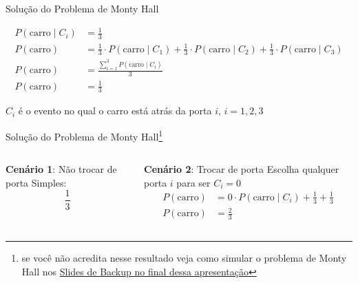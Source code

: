\begin{frame}{Solução do Problema de Monty Hall}
	\begin{idea}
		$$
			\begin{aligned}
				P(\text{carro} \mid C_i) & = \frac{1}{3}                                                                                                                          \\
				P(\text{carro})          & = \frac{1}{3} \cdot P(\text{carro} \mid C_1) + \frac{1}{3} \cdot P(\text{carro} \mid C_2) + \frac{1}{3} \cdot P(\text{carro} \mid C_3) \\
				P(\text{carro})          & = \frac{\sum^3_{i=1}P(\text{carro} \mid C_i)}{3}                                                                                       \\
				P(\text{carro})          & = \frac{1}{3}
			\end{aligned}
		$$
	\end{idea}
	\vfill \vfill
	$C_i$ é o evento no qual o carro está atrás da porta $i$, $i=1,2,3$
\end{frame}

\begin{frame}[t]{Solução do Problema de Monty Hall\footnote{se você não acredita nesse resultado veja como simular o problema de Monty Hall nos \hyperlink{appendixmontyhall}{Slides de Backup no final dessa apresentação}}}
	\begin{columns}[t]
		\begin{column}{0.5\textwidth}
			{\Large \textbf{Cenário 1}: Não trocar de porta} \newline \newline
			Simples: $$\frac{1}{3}$$
		\end{column}
		\begin{column}{0.5\textwidth}
			{\Large \textbf{Cenário 2}: Trocar de porta} \newline \newline
			Escolha qualquer porta $i$ para ser $C_i = 0$
			\vfill
			$$
				\begin{aligned}
					P(\text{carro}) & = 0 \cdot P(\text{carro} \mid C_i) + \frac{1}{3} + \frac{1}{3} \\
					P(\text{carro}) & = \frac{2}{3}
				\end{aligned}
			$$
		\end{column}
	\end{columns}
\end{frame}

